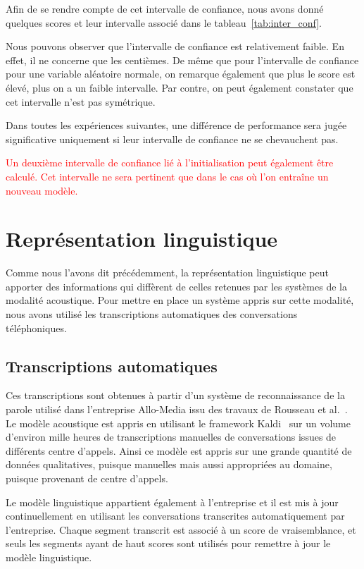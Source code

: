 Afin de se rendre compte de cet intervalle de confiance, nous avons donné quelques scores et leur intervalle associé dans le tableau~\ref{tab:inter_conf}.



Nous pouvons observer que l'intervalle de confiance est relativement faible. En effet, il ne concerne que les centièmes. De même que pour l'intervalle de confiance pour une variable aléatoire normale, on remarque également que plus le score est élevé, plus on a un faible intervalle. Par contre, on peut également constater que cet intervalle n'est pas symétrique.

Dans toutes les expériences suivantes, une différence de performance sera jugée significative uniquement si leur intervalle de confiance ne se chevauchent pas.

\textcolor{red}{Un deuxième intervalle de confiance lié à l'initialisation peut également être calculé. Cet intervalle ne sera pertinent que dans le cas où l'on entraîne un nouveau modèle.}

\section{Représentation linguistique}
Comme nous l'avons dit précédemment, la représentation linguistique peut apporter des informations qui diffèrent de celles retenues par les systèmes de la modalité acoustique. Pour mettre en place un système appris sur cette modalité, nous avons utilisé les transcriptions automatiques des conversations téléphoniques.

\subsection{Transcriptions automatiques}
Ces transcriptions sont obtenues à partir d'un système de reconnaissance de la parole utilisé dans l'entreprise Allo-Media issu des travaux de Rousseau et al.~\cite{Rousseau2014}. Le modèle acoustique est appris en utilisant le framework Kaldi~\cite{Povey2011} sur un volume d'environ mille heures de transcriptions manuelles de conversations issues de différents centre d'appels. Ainsi ce modèle est appris sur une grande quantité de données qualitatives, puisque manuelles mais aussi appropriées au domaine, puisque provenant de centre d'appels.

Le modèle linguistique appartient également à l'entreprise et il est mis à jour continuellement en utilisant les conversations transcrites automatiquement par l'entreprise. Chaque segment transcrit est associé à un score de vraisemblance, et seuls les segments ayant de haut scores sont utilisés pour remettre à jour le modèle linguistique.

